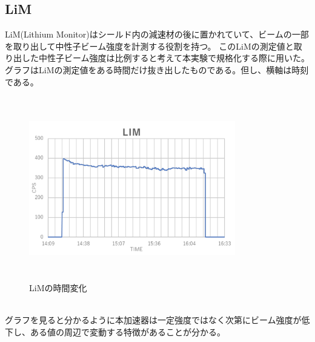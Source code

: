\subsection{LiM}
LiM(Lithium Monitor)はシールド内の減速材の後に置かれていて、ビームの一部を取り出して中性子ビーム強度を計測する役割を持つ。
このLiMの測定値と取り出した中性子ビーム強度は比例すると考えて本実験で規格化する際に用いた。
グラフはLiMの測定値をある時間だけ抜き出したものである。但し、横軸は時刻である。
\begin{figure}[h]
\centering
\includegraphics[width=9cm,height=8cm]{accelerator/LiM.pdf}\caption{LiMの時間変化}
\end{figure}\\
グラフを見ると分かるように本加速器は一定強度ではなく次第にビーム強度が低下し、ある値の周辺で変動する特徴があることが分かる。




